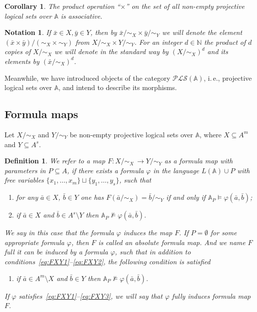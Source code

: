 \documentclass[12pt]{article}
\newtheorem{corollary}{Corollary}
\newtheorem{notation}{Notation}
\newtheorem{definition}{Definition}
\theoremstyle{definition}
\def\N{{\mathbb{N}}}
\def\MA{{\mathbb{A}}}
\def\PLS{{\mathcal{PLS}}}
\begin{document}
\begin{corollary}
The product operation ``$\times$'' on the set of all non-empty projective logical sets over $\MA$ is associative.    
\end{corollary}

\begin{notation}
If $\bar x\in X, \bar y\in Y$, then by $\bar x/{\sim_X}\times \bar y/{\sim_Y}$ we will denote the element $(\bar x \times \bar y)/{(\sim_X\times \sim_Y)}$ from $X/{\sim_X}\times Y/{\sim_Y}$.     For an integer $d\in \N$ the product of $d$ copies of $X/{\sim_X}$ we will denote in the standard way by $(X/{\sim_X})^d$ and its elements by $(\bar x/{\sim_X})^d$.
\end{notation}

Meanwhile, we have introduced objects of the category $\PLS(\MA)$, i.\,e., projective logical sets over $\MA$, and intend to describe its morphisms. 

\subsection{Formula maps}\label{subsec:fm}

Let $X/{\sim_X}$ and $Y/{\sim_Y}$ be non-empty projective logical sets over $\MA$, where $X\subseteq A^m$ and $Y\subseteq A^s$. 

\begin{definition}\label{def:mor}
We refer to a map $F\colon X/{\sim_X} \,\to Y/{\sim_Y}$ as {\em a formula map} with parameters in $P\subseteq A$, if there exists a formula $\varphi$ in the language $L(\MA)\cup P$ with free variables $\{x_1,\ldots,x_m\}\sqcup\{y_1,\ldots,y_s\}$, such that 
\begin{enumerate}[label=(\Roman*)]
    \item\label{eq:FXY1} for any $ \bar a\in X$, $\bar b\in Y$ one has $F(\bar a/{\sim_X})=\bar b/{\sim_Y}$ if and only if $\MA_P\models \varphi(\bar a,\bar b)$;
    \item\label{eq:FXY2} if $\bar a\in X$ and $\bar b\in A^s\setminus Y$ then $\MA_P\not\models \varphi(\bar a,\bar b)$.
\end{enumerate}
We say in this case that the formula $\varphi$ {\em induces} the map $F$. If $P=\emptyset$ for some appropriate formula $\varphi$, then $F$ is called an {\em absolute} formula map. And we name $F$ {\em full} it can be induced by a formula $\varphi$, such that in addition to conditions~\ref{eq:FXY1}--\ref{eq:FXY2}, the following condition is satisfied 
\begin{enumerate}[label=(\Roman*)]\addtocounter{enumi}{2}
    \item\label{eq:FXY3} if $\bar a\in A^m\setminus X$ and $\bar b\in Y$ then $\MA_P\not\models \varphi(\bar a,\bar b)$.
\end{enumerate} 
If $\varphi$ satisfies~\ref{eq:FXY1}--\ref{eq:FXY3}, we will say that $\varphi$ {\em fully induces} formula map $F$. 
\end{definition}
\end{document}
